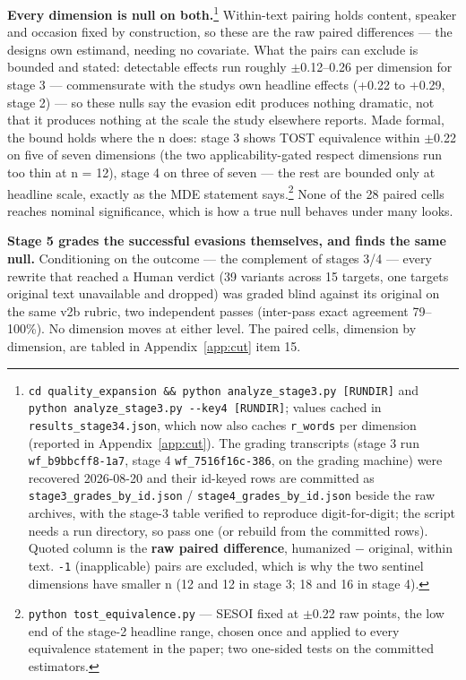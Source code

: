 \textbf{Every dimension is null on both.}\footnote{\texttt{cd\ quality\_expansion\ \&\&\ python\ analyze\_stage3.py\ {[}RUNDIR{]}} and
  \texttt{python\ analyze\_stage3.py\ -\/-key4\ {[}RUNDIR{]}}; values cached in
  \texttt{results\_stage34.json}, which now also caches \texttt{r\_words} per dimension (reported in Appendix~\ref{app:cut}).
  The grading transcripts (stage 3 run \texttt{wf\_b9bbcff8-1a7}, stage 4
  \texttt{wf\_7516f16c-386}, on the grading machine) were recovered 2026-08-20 and
  their id-keyed rows are committed as \texttt{stage3\_\allowbreak{}grades\_\allowbreak{}by\_\allowbreak{}id.\allowbreak{}json} /
  \texttt{stage4\_\allowbreak{}grades\_\allowbreak{}by\_\allowbreak{}id.\allowbreak{}json} beside the raw archives, with the stage-3
  table verified to reproduce digit-for-digit; the script needs a run
  directory, so pass one (or rebuild from the committed rows). Quoted column is the \textbf{raw paired difference},
  humanized \(-\) original, within text. \texttt{-1} (inapplicable) pairs are excluded,
  which is why the two sentinel dimensions have smaller n (12 and 12 in
  stage 3; 18 and 16 in stage 4).} Within-text pairing holds content,
speaker and occasion fixed by construction, so these are the raw paired
differences --- the design\textquotesingle s own estimand, needing no covariate. What the pairs
can exclude is bounded and stated: detectable effects run roughly \(\pm\)0.12--0.26
per dimension for stage 3 --- commensurate with the study\textquotesingle s own headline effects
(+0.22 to +0.29, stage 2) --- so these nulls say the evasion edit produces
nothing dramatic, not that it produces nothing at the scale the study
elsewhere reports. Made formal, the bound holds where the n does: stage 3
shows TOST equivalence within \(\pm\)0.22 on five of seven dimensions (the two
applicability-gated respect dimensions run too thin at n = 12), stage 4 on
three of seven --- the rest are bounded only at headline scale, exactly as the
MDE statement says.\footnote{\texttt{python\ tost\_\allowbreak{}equivalence.\allowbreak{}py} --- SESOI fixed at \(\pm\)0.22 raw points,
  the low end of the stage-2 headline range, chosen once and applied to
  every equivalence statement in the paper; two one-sided tests on the
  committed estimators.} None of the 28 paired cells reaches nominal
significance, which is how a true null behaves under many looks.

\textbf{Stage 5 grades the successful evasions themselves, and finds the same
null.} Conditioning on the outcome --- the complement of stages 3/4 --- every
rewrite that reached a Human verdict (39 variants across 15 targets, one
target\textquotesingle s original text unavailable and dropped) was graded blind against its
original on the same v2b rubric, two independent passes (inter-pass exact
agreement 79--100\%). No dimension moves at either level. The paired cells,
dimension by dimension, are tabled in Appendix~\ref{app:cut} item 15.

